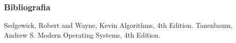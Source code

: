 \documentclass{beamer}
\begin{document}






\begin{frame}
\frametitle{Bibliografia}
\footnotesize {
\begin{thebibliography}{99} %
 Sedgewick, Robert and Wayne, Kevin
\newblock Algorithms, 4th Edition.
 Tanenbaum, Andrew S.
\newblock Modern Operating Systems, 4th Edition.
\end{thebibliography}
}
\end{frame}
\end{document}
